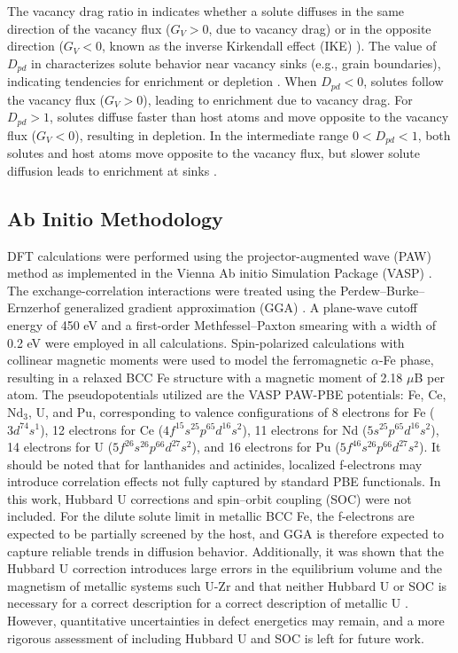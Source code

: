 \documentclass[preprint,12pt]{elsarticle}
\begin{document}
\noindent The vacancy drag ratio in  indicates whether a solute diffuses in the same direction of the vacancy flux  ($G_V > 0$, due to vacancy drag) or in the opposite direction ($G_V < 0$, known as the inverse Kirkendall effect (IKE) \citep{marwick_segregation_1978}). The value of \( D_{pd} \) in  characterizes solute behavior near vacancy sinks (e.g., grain boundaries), indicating tendencies for enrichment or depletion \citep{messina_exact_2014}. When \( D_{pd} < 0 \), solutes follow the vacancy flux (\( G_V > 0 \)), leading to enrichment due to vacancy drag. For \( D_{pd} > 1 \), solutes diffuse faster than host atoms and move opposite to the vacancy flux (\( G_V < 0 \)), resulting in depletion. In the intermediate range \( 0 < D_{pd} < 1 \), both solutes and host atoms move opposite to the vacancy flux, but slower solute diffusion leads to enrichment at sinks \cite{messina_exact_2014}.

\FloatBarrier
\subsection{Ab Initio Methodology}

\noindent DFT calculations were performed using the projector-augmented wave (PAW) method as implemented in the Vienna Ab initio Simulation Package (VASP) \cite{kresse_ab_1993, kresse_efficient_1996}. The exchange-correlation interactions were treated using the Perdew--Burke--Ernzerhof generalized gradient approximation (GGA) \cite{perdew_generalized_1996}. A plane-wave cutoff energy of 450 eV and a first-order Methfessel--Paxton smearing with a width of 0.2 eV were employed \cite{methfessel_high-precision_1989} in all calculations. Spin-polarized calculations with collinear magnetic moments were used to model the ferromagnetic $\alpha$-Fe phase, resulting in a relaxed BCC Fe structure with a magnetic moment of 2.18 $\mu$B per atom. The pseudopotentials utilized are the VASP PAW-PBE potentials: Fe, Ce, Nd$_3$, U, and Pu, corresponding to valence configurations of 8 electrons for Fe ($3d^74s^1$), 12 electrons for Ce ($4f^15s^25p^65d^16s^2$), 11 electrons for Nd ($5s^25p^65d^16s^2$), 14 electrons for U ($5f^26s^26p^66d^27s^2$), and 16 electrons for Pu ($5f^46s^26p^66d^27s^2$).
It should be noted that for lanthanides and actinides, localized f-electrons may introduce correlation effects not fully captured by standard PBE functionals. In this work, Hubbard U corrections \cite{dudarev_effect_1997, cococcioni_linear_2005} and spin–orbit coupling (SOC) \cite{steiner_calculation_2016} were not included. For the dilute solute limit in metallic BCC Fe, the f-electrons are expected to be partially screened by the host, and GGA is therefore expected to capture reliable trends in diffusion behavior. Additionally, it was shown that the Hubbard U correction introduces large errors in the equilibrium volume and the magnetism of metallic systems such U-Zr \cite{soderlind_electron_2014, shousha_magnetism_2024} and that neither Hubbard U or SOC is necessary for a correct description for a correct description of metallic U \cite{soderlind_comment_2014}.
However, quantitative uncertainties in defect energetics may remain, and a more rigorous assessment of including Hubbard U and SOC is left for future work.
\end{document}
